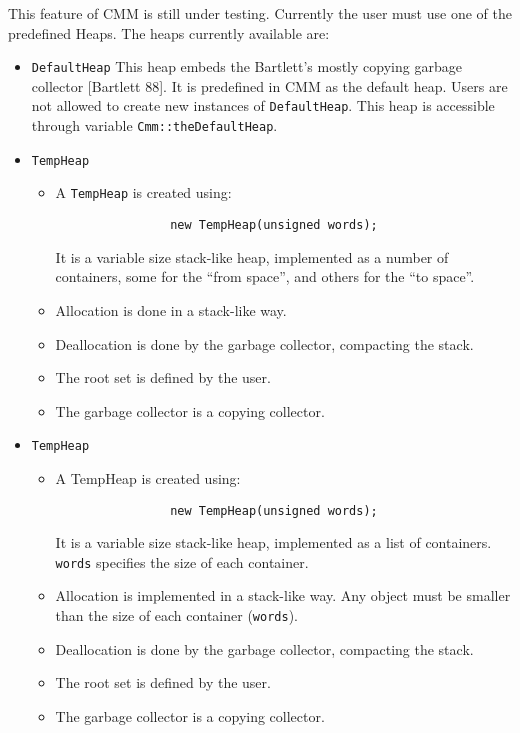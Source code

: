 This feature of CMM is still under testing. Currently the user must use one of
the predefined Heaps. The heaps currently available are:

\begin{itemize}
\item{{\tt DefaultHeap}} This heap embeds the Bartlett's mostly copying
  garbage collector [Bartlett 88].  It is predefined in CMM as the default
  heap.  Users are not allowed to create new instances of {\tt DefaultHeap}.
  This heap is accessible through variable {\tt Cmm::theDefaultHeap}.

\item{{\tt TempHeap}}
\begin{itemize}

\item A {\tt TempHeap} is created using:
\begin{verbatim}
                new TempHeap(unsigned words);
\end{verbatim}
  It is a variable size stack-like heap, implemented as a number of
  containers, some for the ``from space'', and others for the ``to space''.

\item Allocation is done in a stack-like way.

\item Deallocation is done by the garbage collector, compacting the stack.

\item The root set is defined by the user.

\item The garbage collector is a copying collector.
\end{itemize}

\item{{\tt TempHeap}}
\begin{itemize}

\item A TempHeap is created using:
\begin{verbatim}
                new TempHeap(unsigned words);
\end{verbatim}
  It is a variable size stack-like heap, implemented as a list of containers.
  {\tt words} specifies the size of each container.

\item Allocation is implemented in a stack-like way. Any object must be
  smaller than the size of each container ({\tt words}).

\item Deallocation is done by the garbage collector, compacting the stack.

\item The root set is defined by the user.

\item The garbage collector is a copying collector.
\end{itemize}

\end{itemize}

